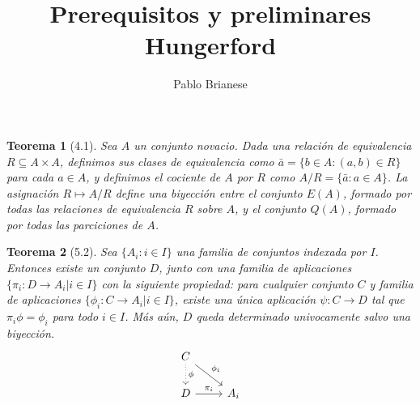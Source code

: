 \documentclass{report}
\title{Prerequisitos y preliminares \\ Hungerford}
\author{Pablo Brianese}
\newtheorem{theorem}{Teorema}
\begin{document}
  \maketitle

  \begin{theorem}[4.1]
    Sea \(A\) un conjunto novacio.
    Dada una relación de equivalencia \(R \subseteq A \times A\), definimos sus clases de equivalencia como \(\bar{a} = \{b \in A : (a, b) \in R\}\) para cada \(a \in A\), y definimos el cociente de \(A\) por \(R\) como \(A / R = \{\bar{a} : a \in A\}\).
    La asignación \(R \mapsto A / R\) define una biyección entre el conjunto \(E(A)\), formado por todas las relaciones de equivalencia \(R\) sobre \(A\), y el conjunto \(Q(A)\), formado por todas las parciciones de \(A\).
  \end{theorem}

  \begin{theorem}[5.2]
    Sea \(\{A_i : i \in I\}\) una familia de conjuntos indexada por \(I\).
    Entonces existe un conjunto \(D\), junto con una familia de aplicaciones \(\{\pi_i : D \rightarrow A_i | i \in I\}\) con la siguiente propiedad:
    para cualquier conjunto \(C\) y familia de aplicaciones \(\{\phi_i : C \rightarrow A_i | i \in I\}\), existe una única aplicación \(\psi : C \rightarrow D\) tal que \(\pi_i \phi = \phi_i\) para todo \(i \in I\).
    Más aún, \(D\) queda determinado univocamente salvo una biyección.
    \[
      \begin{tikzcd}
        C \arrow{rd}{\phi_i} \arrow[dotted]{d}{\phi} \\
        D \arrow{r}{\pi_i} & A_i
      \end{tikzcd}
    \]
  \end{theorem}
\end{document}
